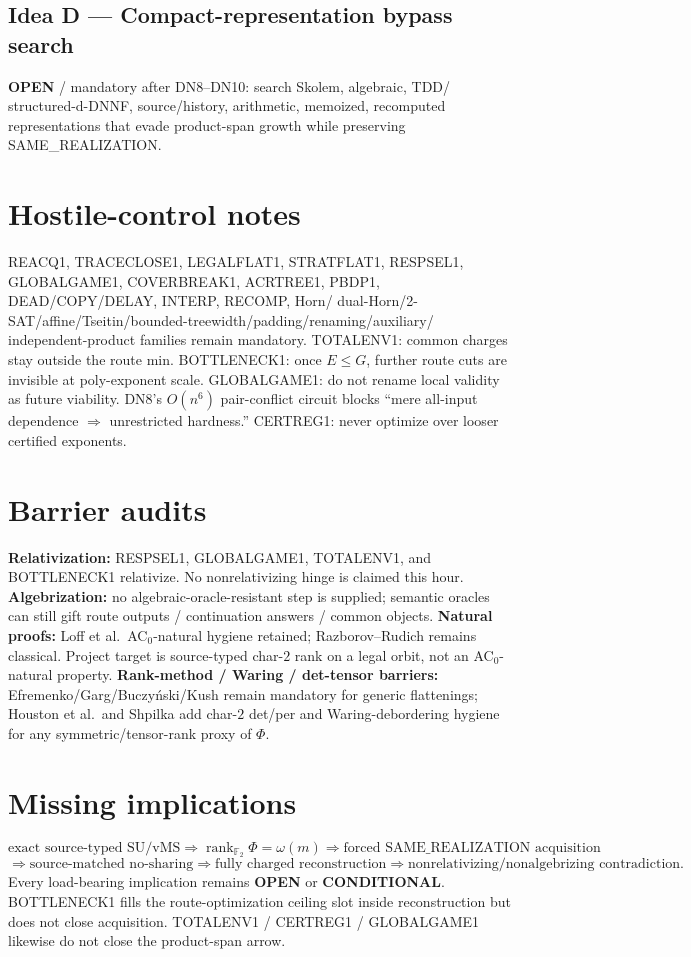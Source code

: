 \documentclass[11pt]{article}
\begin{document}
\subsection*{Idea D --- Compact-representation bypass search}
\textbf{OPEN} / mandatory after DN8--DN10: search Skolem, algebraic, TDD/
structured-d-DNNF, source/history, arithmetic, memoized, recomputed
representations that evade product-span growth while preserving
SAME\_REALIZATION.

\section*{Hostile-control notes}
REACQ1, TRACECLOSE1, LEGALFLAT1, STRATFLAT1, RESPSEL1, GLOBALGAME1,
COVERBREAK1, ACRTREE1, PBDP1, DEAD/COPY/DELAY, INTERP, RECOMP, Horn/
dual-Horn/2-SAT/affine/Tseitin/bounded-treewidth/padding/renaming/auxiliary/
independent-product families remain mandatory. TOTALENV1: common charges stay
outside the route min. BOTTLENECK1: once $E\le G$, further route cuts are
invisible at poly-exponent scale. GLOBALGAME1: do not rename local validity as
future viability. DN8's $O(n^6)$ pair-conflict circuit blocks ``mere all-input
dependence $\Rightarrow$ unrestricted hardness.'' CERTREG1: never optimize over
looser certified exponents.

\section*{Barrier audits}
\textbf{Relativization:} RESPSEL1, GLOBALGAME1, TOTALENV1, and BOTTLENECK1
relativize. No nonrelativizing hinge is claimed this hour.
\textbf{Algebrization:} no algebraic-oracle-resistant step is supplied;
semantic oracles can still gift route outputs / continuation answers / common
objects.
\textbf{Natural proofs:} Loff et al.\ AC$_0$-natural hygiene retained;
Razborov--Rudich remains classical. Project target is source-typed char-$2$
rank on a legal orbit, not an AC$_0$-natural property.
\textbf{Rank-method / Waring / det-tensor barriers:} Efremenko/Garg/Buczy\'nski/Kush
remain mandatory for generic flattenings; Houston et al.\ and Shpilka add
char-$2$ det/per and Waring-debordering hygiene for any symmetric/tensor-rank
proxy of $\Phi$.

\section*{Missing implications}
\[
\text{exact source-typed SU/vMS}
\Longrightarrow
\operatorname{rank}_{\mathbb F_2}\Phi=\omega(m)
\Longrightarrow
\text{forced SAME\_REALIZATION acquisition}
\]
\[
\Longrightarrow
\text{source-matched no-sharing}
\Longrightarrow
\text{fully charged reconstruction}
\Longrightarrow
\text{nonrelativizing/nonalgebrizing contradiction}.
\]
Every load-bearing implication remains \textbf{OPEN} or \textbf{CONDITIONAL}.
BOTTLENECK1 fills the route-optimization ceiling slot inside reconstruction but
does not close acquisition. TOTALENV1 / CERTREG1 / GLOBALGAME1 likewise do not
close the product-span arrow.
\end{document}
